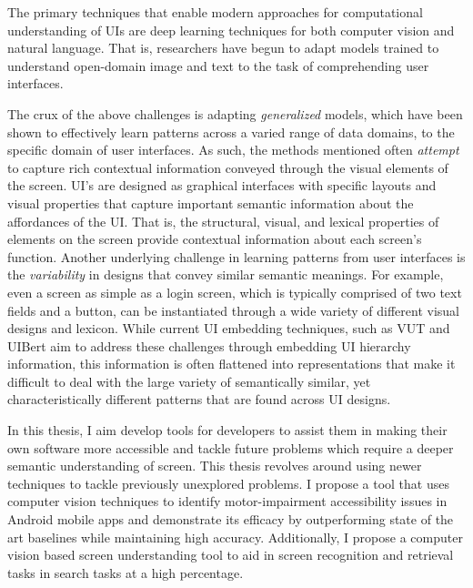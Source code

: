 The primary techniques that enable modern approaches for computational understanding of UIs are deep learning techniques for both computer vision and natural language. That is, researchers have begun to adapt models trained to understand open-domain image and text to the task of comprehending user interfaces. 

The crux of the above challenges is adapting \textit{generalized} models, which have been shown to effectively learn patterns across a varied range of data domains, to the specific domain of user interfaces. As such, the methods mentioned often \textit{attempt} to capture rich contextual information conveyed through the visual elements of the screen. UI's are designed as graphical interfaces with specific layouts and visual properties that capture important semantic information about the affordances of the UI. That is, the structural, visual, and lexical properties of elements on the screen provide contextual information about each screen's function. 
Another underlying challenge in learning patterns from user interfaces is the \textit{variability} in designs that convey similar semantic meanings. For example, even a screen as simple as a login screen, which is typically comprised of two text fields and a button, can be instantiated through a wide variety of different visual designs and lexicon. While current UI embedding techniques, such as VUT and UIBert aim to address these challenges through embedding UI hierarchy information, this information is often flattened into representations that make it difficult to deal with the large variety of semantically similar, yet characteristically different patterns that are found across UI designs.

In this thesis, I aim develop tools for developers to assist them in making their own software more accessible and tackle future problems which require a deeper semantic understanding of screen. This thesis revolves around using newer techniques to tackle previously unexplored problems. I propose a tool that uses computer vision techniques to identify motor-impairment accessibility issues in Android mobile apps and demonstrate its efficacy by outperforming state of the art baselines while maintaining high accuracy. Additionally, I propose a computer vision based screen understanding tool to aid in screen recognition and retrieval tasks in search tasks at a high percentage. 

